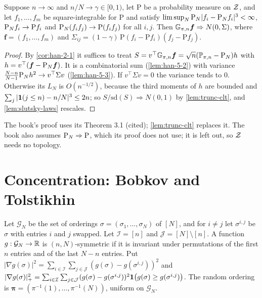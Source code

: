 \begin{theorem}
  \label{thm:han-5-5}
  Suppose $n\to\infty$ and $n/N\to\gamma\in[0,1)$, let $\mathrm P$ be a probability measure on $\mathcal{Z}$, and let $f_1,\dots,f_m$ be square-integrable for $\mathrm P$ and satisfy $\limsup_N\mathrm{P}_N|f_i-\mathrm{P}_N f_i|^3<\infty$, $\mathrm{P}_N f_i\to\mathrm Pf_i$ and $\mathrm{P}_N(f_if_j)\to\mathrm P(f_if_j)$ for all $i,j$. Then $\mathbb{G}_{\pi,n}\boldsymbol f\Rightarrow N(0,\Sigma)$, where $\boldsymbol f=(f_1,\dots,f_m)$ and $\Sigma_{ij}=(1-\gamma)\,\mathrm P(f_i-\mathrm Pf_i)(f_j-\mathrm Pf_j)$.
\end{theorem}
\begin{proof}
  By \cref{cor:han-2-1} it suffices to treat $S=v^\top\mathbb{G}_{\pi,n}\boldsymbol f=\sqrt n(\mathbb{P}_{\pi,n}-\mathrm{P}_N)h$ with $h=v^\top(\boldsymbol f-\mathrm{P}_N\boldsymbol f)$. It is a combinatorial sum (\cref{lem:han-5-2}) with variance $\frac{N-n}{N-1}\mathrm{P}_N h^2\to v^\top\Sigma v$ (\cref{lem:han-5-3}). If $v^\top\Sigma v=0$ the variance tends to $0$. Otherwise its $L_N$ is $O(n^{-1/2})$, because the third moments of $h$ are bounded and $\sum_j|\mathbf{1}(j\le n)-n/N|^3\le2n$; so $S/\mathrm{sd}(S)\Rightarrow N(0,1)$ by \cref{lem:trunc-clt}, and \cref{lem:slutsky-laws} rescales.
\end{proof}
\begin{remark}
  The book's proof uses its Theorem 3.1 (cited); \cref{lem:trunc-clt} replaces it. The book also assumes $\mathrm{P}_N\Rightarrow\mathrm P$, which its proof does not use; it is left out, so $\mathcal{Z}$ needs no topology.
\end{remark}

\section{Concentration: Bobkov and Tolstikhin}

\begin{definition}
  \label{def:han-5-1}
  Let $\mathcal G_N$ be the set of orderings $\sigma=(\sigma_1,\dots,\sigma_N)$ of $[N]$, and for $i\ne j$ let $\sigma^{i,j}$ be $\sigma$ with entries $i$ and $j$ swapped. Let $\mathcal I=[n]$ and $\mathcal J=[N]\setminus[n]$. A function $g:\mathcal G_N\to\mathbb{R}$ is $(n,N)$-symmetric if it is invariant under permutations of the first $n$ entries and of the last $N-n$ entries. Put
  $|\nabla g(\sigma)|^2=\sum_{i\in\mathcal I}\sum_{j\in\mathcal J}(g(\sigma)-g(\sigma^{i,j}))^2$ and
  $|\nabla g(\sigma)|_+^2=\sum_{i\in\mathcal I}\sum_{j\in\mathcal J}(g(\sigma)-g(\sigma^{i,j}))^2\mathbf{1}\bigl(g(\sigma)\ge g(\sigma^{i,j})\bigr)$.
  The random ordering is $\boldsymbol\pi=(\pi^{-1}(1),\dots,\pi^{-1}(N))$, uniform on $\mathcal G_N$.
\end{definition}

